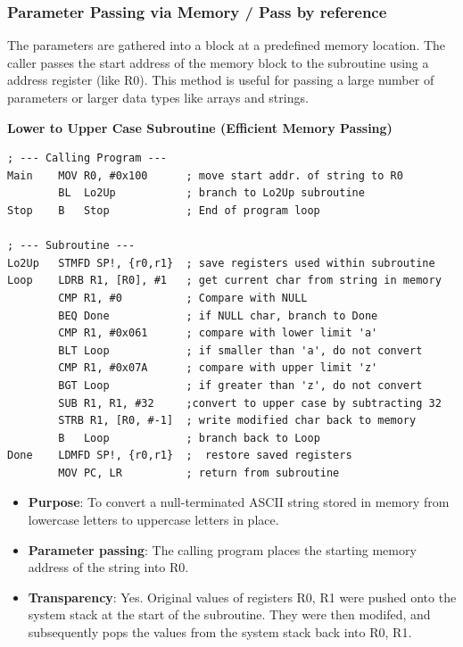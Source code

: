 \documentclass[../comorg-part1.tex]{subfiles}
\begin{document}
\medskip
\noindent
\begin{minipage}{\textwidth}
\subsubsection{Parameter Passing via Memory / Pass by reference}
The parameters are gathered into a block at a predefined memory location.\newline
The caller passes the start address of the memory block to the subroutine using a address register (like R0).\newline
This method is useful for passing a large number of parameters or larger data types like arrays and strings.

\noindent\textbf{Lower to Upper Case Subroutine (Efficient Memory Passing)}
\begin{lstlisting}
; --- Calling Program ---
Main    MOV R0, #0x100      ; move start addr. of string to R0
        BL  Lo2Up           ; branch to Lo2Up subroutine
Stop    B   Stop            ; End of program loop

; --- Subroutine ---
Lo2Up   STMFD SP!, {r0,r1}  ; save registers used within subroutine
Loop    LDRB R1, [R0], #1   ; get current char from string in memory
        CMP R1, #0          ; Compare with NULL
        BEQ Done            ; if NULL char, branch to Done
        CMP R1, #0x061      ; compare with lower limit 'a'
        BLT Loop            ; if smaller than 'a', do not convert
        CMP R1, #0x07A      ; compare with upper limit 'z'
        BGT Loop            ; if greater than 'z', do not convert
        SUB R1, R1, #32     ;convert to upper case by subtracting 32
        STRB R1, [R0, #-1]  ; write modified char back to memory
        B   Loop            ; branch back to Loop
Done    LDMFD SP!, {r0,r1}  ;  restore saved registers
        MOV PC, LR          ; return from subroutine
\end{lstlisting}
\end{minipage}

\begin{itemize}
    \item \textbf{Purpose}: To convert a null-terminated ASCII string stored in memory from lowercase letters to uppercase letters in place.
    \item \textbf{Parameter passing}: The calling program places the starting memory address of the string into R0.
    \item \textbf{Transparency}: Yes. Original values of registers R0, R1 were pushed onto the system stack at the start of the subroutine.
    They were then modifed, and subsequently pops the values from the system stack back into R0, R1.
\end{itemize}
\end{document}
